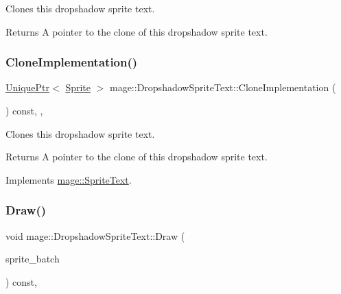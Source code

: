 Clones this dropshadow sprite text.

\begin{DoxyReturn}{Returns}
A pointer to the clone of this dropshadow sprite text. 
\end{DoxyReturn}
\hypertarget{classmage_1_1_dropshadow_sprite_text_af997217dd243061e0490bbcd4bfde7ed}{}\label{classmage_1_1_dropshadow_sprite_text_af997217dd243061e0490bbcd4bfde7ed} 
\subsubsection{\texorpdfstring{Clone\+Implementation()}{CloneImplementation()}}
{\footnotesize\ttfamily \hyperlink{namespacemage_a3316d7143a973e37adf1110f2e80ca31}{Unique\+Ptr}$<$ \hyperlink{classmage_1_1_sprite}{Sprite} $>$ mage\+::\+Dropshadow\+Sprite\+Text\+::\+Clone\+Implementation (\begin{DoxyParamCaption}{ }\end{DoxyParamCaption}) const\hspace{0.3cm}{\ttfamily [override]}, {\ttfamily [private]}, {\ttfamily [virtual]}}

Clones this dropshadow sprite text.

\begin{DoxyReturn}{Returns}
A pointer to the clone of this dropshadow sprite text. 
\end{DoxyReturn}


Implements \hyperlink{classmage_1_1_sprite_text_aa2c63346f5ad7f63f7a6d474df3556ef}{mage\+::\+Sprite\+Text}.

\hypertarget{classmage_1_1_dropshadow_sprite_text_af76422c9812d7dc38e9b98e587103c67}{}\label{classmage_1_1_dropshadow_sprite_text_af76422c9812d7dc38e9b98e587103c67} 
\subsubsection{\texorpdfstring{Draw()}{Draw()}}
{\footnotesize\ttfamily void mage\+::\+Dropshadow\+Sprite\+Text\+::\+Draw (\begin{DoxyParamCaption}\item[{\hyperlink{classmage_1_1_sprite_batch}{Sprite\+Batch} \&}]{sprite\+\_\+batch }\end{DoxyParamCaption}) const\hspace{0.3cm}{\ttfamily [override]}, {\ttfamily [virtual]}}

